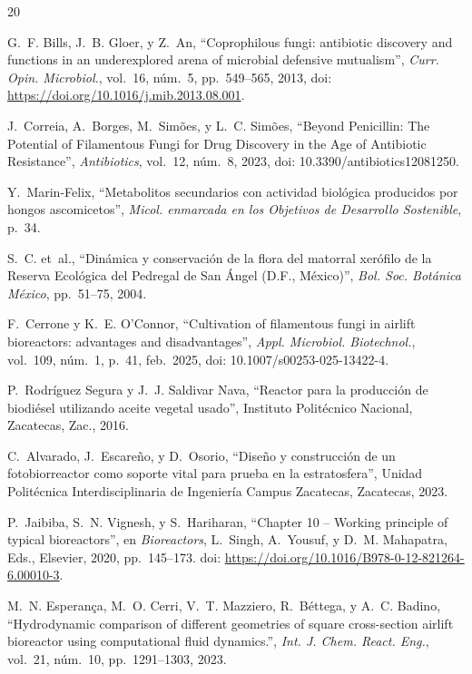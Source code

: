 
\begin{thebibliography}{20}

G.~F. Bills, J.~B. Gloer, y Z.~An, ``Coprophilous fungi: antibiotic discovery and functions in an underexplored arena of microbial defensive mutualism'', \textit{Curr. Opin. Microbiol.}, vol.~16, núm.~5, pp.~549--565, 2013, doi: \url{https://doi.org/10.1016/j.mib.2013.08.001}.

J.~Correia, A.~Borges, M.~Simões, y L.~C. Simões, ``Beyond Penicillin: The Potential of Filamentous Fungi for Drug Discovery in the Age of Antibiotic Resistance'', \textit{Antibiotics}, vol.~12, núm.~8, 2023, doi: 10.3390/antibiotics12081250.

Y.~Marin-Felix, ``Metabolitos secundarios con actividad biológica producidos por hongos ascomicetos'', \textit{Micol. enmarcada en los Objetivos de Desarrollo Sostenible}, p.~34.

S.~C. et~al., ``Dinámica y conservación de la flora del matorral xerófilo de la Reserva Ecológica del Pedregal de San Ángel (D.F., México)'', \textit{Bol. Soc. Botánica México}, pp.~51--75, 2004.

F.~Cerrone y K.~E. O'Connor, ``Cultivation of filamentous fungi in airlift bioreactors: advantages and disadvantages'', \textit{Appl. Microbiol. Biotechnol.}, vol.~109, núm.~1, p.~41, feb.~2025, doi: 10.1007/s00253-025-13422-4.

P.~Rodríguez Segura y J.~J. Saldivar Nava, ``Reactor para la producción de biodiésel utilizando aceite vegetal usado'', Instituto Politécnico Nacional, Zacatecas, Zac., 2016.

C.~Alvarado, J.~Escareño, y D.~Osorio, ``Diseño y construcción de un fotobiorreactor como soporte vital para prueba en la estratosfera'', Unidad Politécnica Interdisciplinaria de Ingeniería Campus Zacatecas, Zacatecas, 2023.

P.~Jaibiba, S.~N. Vignesh, y S.~Hariharan, ``Chapter 10 -- Working principle of typical bioreactors'', en \textit{Bioreactors}, L.~Singh, A.~Yousuf, y D.~M. Mahapatra, Eds., Elsevier, 2020, pp.~145--173. doi: \url{https://doi.org/10.1016/B978-0-12-821264-6.00010-3}.

M.~N. Esperança, M.~O. Cerri, V.~T. Mazziero, R.~Béttega, y A.~C. Badino, ``Hydrodynamic comparison of different geometries of square cross-section airlift bioreactor using computational fluid dynamics.'', \textit{Int. J. Chem. React. Eng.}, vol.~21, núm.~10, pp.~1291--1303, 2023.


\end{thebibliography}
